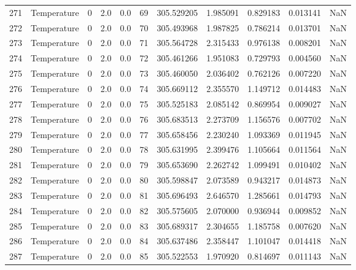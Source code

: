 \begin{tabular}{llrrrrrrrrr}
271 &  Temperature &       0 &  2.0 &  0.0 &   69 &  305.529205 &  1.985091 &  0.829183 &   0.013141 &      NaN \\
272 &  Temperature &       0 &  2.0 &  0.0 &   70 &  305.493968 &  1.987825 &  0.786214 &   0.013701 &      NaN \\
273 &  Temperature &       0 &  2.0 &  0.0 &   71 &  305.564728 &  2.315433 &  0.976138 &   0.008201 &      NaN \\
274 &  Temperature &       0 &  2.0 &  0.0 &   72 &  305.461266 &  1.951083 &  0.729793 &   0.004560 &      NaN \\
275 &  Temperature &       0 &  2.0 &  0.0 &   73 &  305.460050 &  2.036402 &  0.762126 &   0.007220 &      NaN \\
276 &  Temperature &       0 &  2.0 &  0.0 &   74 &  305.669112 &  2.355570 &  1.149712 &   0.014483 &      NaN \\
277 &  Temperature &       0 &  2.0 &  0.0 &   75 &  305.525183 &  2.085142 &  0.869954 &   0.009027 &      NaN \\
278 &  Temperature &       0 &  2.0 &  0.0 &   76 &  305.683513 &  2.273709 &  1.156576 &   0.007702 &      NaN \\
279 &  Temperature &       0 &  2.0 &  0.0 &   77 &  305.658456 &  2.230240 &  1.093369 &   0.011945 &      NaN \\
280 &  Temperature &       0 &  2.0 &  0.0 &   78 &  305.631995 &  2.399476 &  1.105664 &   0.011564 &      NaN \\
281 &  Temperature &       0 &  2.0 &  0.0 &   79 &  305.653690 &  2.262742 &  1.099491 &   0.010402 &      NaN \\
282 &  Temperature &       0 &  2.0 &  0.0 &   80 &  305.598847 &  2.073589 &  0.943217 &   0.014873 &      NaN \\
283 &  Temperature &       0 &  2.0 &  0.0 &   81 &  305.696493 &  2.646570 &  1.285661 &   0.014793 &      NaN \\
284 &  Temperature &       0 &  2.0 &  0.0 &   82 &  305.575605 &  2.070000 &  0.936944 &   0.009852 &      NaN \\
285 &  Temperature &       0 &  2.0 &  0.0 &   83 &  305.689317 &  2.304655 &  1.185758 &   0.007620 &      NaN \\
286 &  Temperature &       0 &  2.0 &  0.0 &   84 &  305.637486 &  2.358447 &  1.101047 &   0.014418 &      NaN \\
287 &  Temperature &       0 &  2.0 &  0.0 &   85 &  305.522553 &  1.970920 &  0.814697 &   0.011143 &      NaN \\

\end{tabular}
